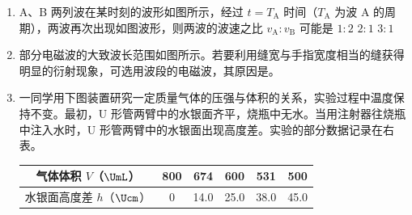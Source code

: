 \documentclass[\gkver]{gaokaozhenti}
\begin{document}
\begin{enumerate}
\item
A、B 两列波在某时刻的波形如图所示，经过 $t=T_{\mathrm{A}}$ 时间（$T_{\mathrm{A}}$ 为波 A 的周期），两波再次出现如图波形，则两波的波速之比 $v_{\mathrm{A}}:v_{\mathrm{B}}$ 可能是
{$1:2$}
{$2:1$}
{$3:1$}

\item
部分电磁波的大致波长范围如图所示。若要利用缝宽与手指宽度相当的缝获得明显的衍射现象，可选用波段的电磁波，其原因是。

\onepicture[align=right, w=7.00cm]{}


\item
一同学用下图装置研究一定质量气体的压强与体积的关系，实验过程中温度保持不变。最初，U 形管两臂中的水银面齐平，烧瓶中无水。当用注射器往烧瓶中注入水时，U 形管两臂中的水银面出现高度差。实验的部分数据记录在右表。

\begin{center}
\begin{tabular}{|c|c|c|c|c|c|}
\hline
气体体积 $V$（$\UmL$） & 800 & 674 & 600 & 531 & 500 \\ \hline
水银面高度差 $h$（$\Ucm$） & 0 & 14.0 & 25.0 & 38.0 & 45.0 \\ \hline
\end{tabular}
\end{center}


\end{enumerate}
\end{document}
